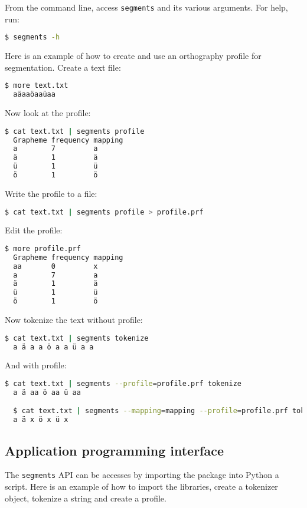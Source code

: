 From the command line, access \texttt{segments} and its 
various arguments. For help, run:

\begin{lstlisting}[language=bash]
  $ segments -h
\end{lstlisting}

\noindent Here is an example of how to create and use an orthography 
profile for segmentation. Create a text file:

\begin{lstlisting}[language=bash]
  $ more text.txt
  aäaaöaaüaa
\end{lstlisting}

\noindent Now look at the profile:

\begin{lstlisting}[language=bash,texcl=true]
  $ cat text.txt | segments profile
  Grapheme frequency mapping
  a        7         a
  ä        1         ä
  ü        1         ü
  ö        1         ö
\end{lstlisting}

\noindent Write the profile to a file:

\begin{lstlisting}[language=bash]
  $ cat text.txt | segments profile > profile.prf
\end{lstlisting}

\noindent Edit the profile:

\begin{lstlisting}[language=bash]
  $ more profile.prf
  Grapheme frequency mapping
  aa       0         x
  a        7         a
  ä        1         ä
  ü        1         ü
  ö        1         ö
\end{lstlisting}

\noindent Now tokenize the text without profile:

\begin{lstlisting}[language=bash]
  $ cat text.txt | segments tokenize
  a ä a a ö a a ü a a	
\end{lstlisting}

\noindent And with profile:
\begin{lstlisting}[language=bash]
  $ cat text.txt | segments --profile=profile.prf tokenize
  a ä aa ö aa ü aa

  $ cat text.txt | segments --mapping=mapping --profile=profile.prf tokenize
  a ä x ö x ü x
\end{lstlisting}


\subsection*{Application programming interface}
The \texttt{segments} API can be accesses by importing 
the package into Python a script. Here is an example of 
how to import the libraries, create a tokenizer object, 
tokenize a string and create a profile.

